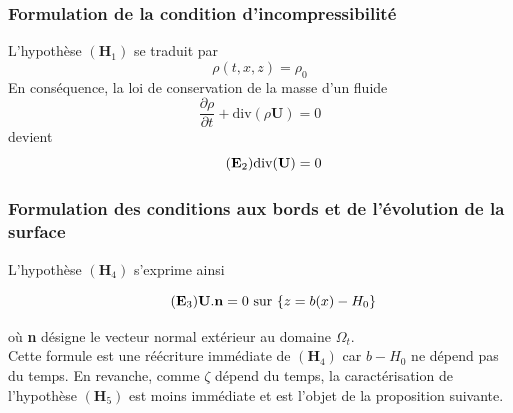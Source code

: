\documentclass[12pt,a4paper]{article}
\numberwithin{equation}{section}
\begin{document}
\subsubsection{Formulation de la condition d'incompressibilité}
L'hypothèse $(\textbf{H}_1)$ se traduit par
$$\rho(t,x,z) = \rho_0$$
En conséquence, la loi de conservation de la masse d'un fluide
\begin{equation} \label{mass_conservation}
    \frac{\partial \rho}{\partial t} +\text{div}(\rho\textbf{U}) = 0
\end{equation}
devient
\begin{equation} \tag{$\textbf{E}_2$} \label{divergence_free}
    \text{div} (\textbf{U}) = 0
\end{equation}

\subsubsection{Formulation des conditions aux bords et de l'évolution de la surface}

L'hypothèse $(\textbf{H}_4)$ s'exprime ainsi

\begin{equation}
    \tag{${\textbf{E}}_3$} \label{eq_E2}
    \textbf{U}.\textbf{n} = 0 \text{  sur }\{z = b(x)-H_0\}
\end{equation} 

où \textbf{n} désigne le vecteur normal extérieur au domaine $\Omega_t$.\\

Cette formule est une réécriture immédiate de $(\textbf{H}_4)$  car $b-H_0$ ne dépend pas du temps. En revanche, comme $\zeta$ dépend du temps, la caractérisation de l'hypothèse $(\textbf{H}_5)$ est moins immédiate et est l'objet de la proposition suivante.
\end{document}
